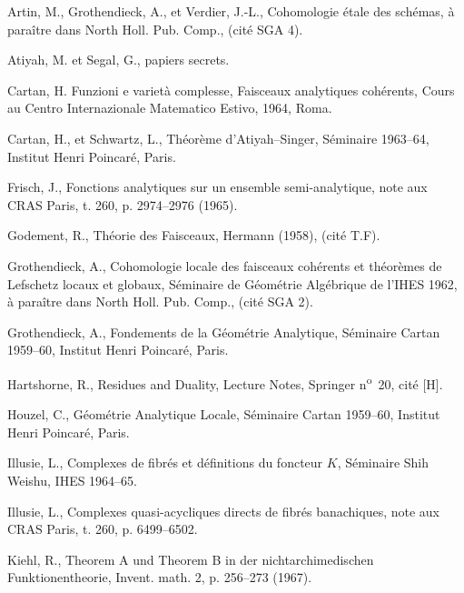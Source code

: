 Artin, M., Grothendieck, A., et Verdier, J.-L., Cohomologie étale des schémas, à paraître dans North Holl. Pub. Comp., (cité SGA 4).
\item Atiyah, M. et Segal, G., papiers secrets.
\item Cartan, H. Funzioni e varietà complesse, Faisceaux analytiques cohérents, Cours au Centro Internazionale Matematico Estivo, 1964, Roma.
\item Cartan, H., et Schwartz, L., Théorème d'Atiyah--Singer, Séminaire 1963--64, Institut Henri Poincaré, Paris.
\item Frisch, J., Fonctions analytiques sur un ensemble semi-analytique, note aux CRAS Paris, t. 260, p. 2974--2976 (1965).
\item Godement, R., Théorie des Faisceaux, Hermann (1958), (cité T.F).
\item Grothendieck, A., Cohomologie locale des faisceaux cohérents et théorèmes de Lefschetz locaux et globaux, Séminaire de Géométrie Algébrique de l'IHES 1962, à paraître dans North Holl. Pub. Comp., (cité SGA 2).
\item Grothendieck, A., Fondements de la Géométrie Analytique, Séminaire Cartan 1959--60, Institut Henri Poincaré, Paris.
\item Hartshorne, R., Residues and Duality, Lecture Notes, Springer n\textsuperscript{o}~20, cité [H].
\item Houzel, C., Géométrie Analytique Locale, Séminaire Cartan 1959--60, Institut Henri Poincaré, Paris.
\item Illusie, L., Complexes de fibrés et définitions du foncteur $K$, Séminaire Shih Weishu, IHES 1964--65.
\item Illusie, L., Complexes quasi-acycliques directs de fibrés banachiques, note aux CRAS Paris, t. 260, p. 6499--6502.
\item Kiehl, R., Theorem A und Theorem B in der nichtarchimedischen Funktionentheorie, Invent. math. 2, p. 256--273 (1967).
\item
